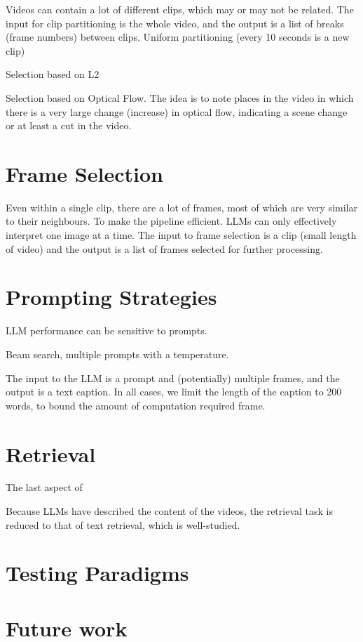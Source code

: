 \documentclass{article}
\begin{document}
Videos can contain a lot of different clips, which may or may not be related.
The input for clip partitioning is the whole video, and the output is a list of breaks (frame numbers) between clips.
Uniform partitioning (every 10 seconds is a new clip)


Selection based on L2

Selection based on Optical Flow.
The idea is to note places in the video in which there is a very large change (increase) in optical flow, indicating a scene change or at least a cut in the video.

\section{Frame Selection}

Even within a single clip, there are a lot of frames, most of which are very similar to their neighbours.
To make the pipeline efficient.
LLMs can only effectively interpret one image at a time.
The input to frame selection is a clip (small length of video) and the output is a list of frames selected for further processing.

\section{Prompting Strategies}

LLM performance can be sensitive to prompts.

Beam search, multiple prompts with a temperature.

The input to the LLM is a prompt and (potentially) multiple frames, and the output is a text caption.
In all cases, we limit the length of the caption to 200 words, to bound the amount of computation required frame.

\section{Retrieval}

The last aspect of 

Because LLMs have described the content of the videos, the retrieval task is reduced to that of text retrieval, which is well-studied.

\section{Testing Paradigms}

\section{Future work}
\end{document}
